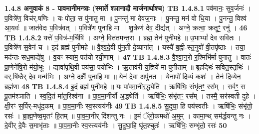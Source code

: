 \documentclass[17pt]{extarticle}
\begin{document}
                \textbf{ 1.4.8     अनुवाकं   8 - पावमानीमन्त्राः (स्मार्ते श्ञानादौ मार्जनार्थाश्च)} \newline
                                \textbf{ TB 1.4.8.1} \newline
                  पव॑मानः॒ सुव॒र्जनः॑ । प॒वित्रे॑ण॒ विच॑र्.षणिः । यः पोता॒ स पु॑नातु मा ॥ पु॒नन्तु॑ मा देवज॒नाः । पु॒नन्तु॒ मन॑ वो धि॒या । पु॒नन्तु॒ विश्व॑ आ॒यवः॑ ॥ जात॑वेदः प॒वित्र॑वत् । प॒वित्रे॑ण पुनाहि मा । शु॒क्रेण॑ देव॒ दीद्य॑त् । अग्ने॒ क्रत्वा॒ क्रतूꣳ॒॒ रनु॑ । \textbf{ 46} \newline
                  \newline
                                \textbf{ TB 1.4.8.2} \newline
                  यत्ते॑ प॒वित्र॑-म॒र्चिषि॑ । अग्ने॒ वित॑तमन्त॒रा । ब्रह्म॒ तेन॑ पुनीमहे ॥ उ॒भाभ्यां᳚ देव सवितः ।प॒वित्रे॑ण स॒वेन॑ च । इ॒दं ब्रह्म॑ पुनीमहे ॥ वै॒श्व॒दे॒वी पु॑न॒ती दे॒व्यागा᳚त् । यस्यै॑ ब॒ह्वी-स्त॒नुवो॑ वी॒तपृ॑ष्ठाः । तया॒ मद॑न्तः सध॒माद्ये॑षु । व॒यꣳ स्या॑म॒ पत॑यो रयी॒णाम् । \textbf{ 47} \newline
                  \newline
                                \textbf{ TB 1.4.8.3} \newline
                  वै॒श्वा॒न॒रो र॒श्मिभि॑र्मा पुनातु । वातः॑ प्रा॒णेने॑षि॒रो म॑यो॒भूः । द्यावा॑पृथि॒वी पय॑सा॒ पयो॑भिः । ऋ॒ताव॑री य॒ज्ञिये॑ मा पुनीताम् ॥ बृ॒हद्भिः॑ सवित॒स्तृभिः॑ । वर्.षि॑ष्ठैर् देव॒ मन्म॑भिः । अग्ने॒ दक्षैः᳚ पुनाहि मा ॥ येन॑ दे॒वा अपु॑नत । येनापो॑ दि॒व्यं कशः॑ । तेन॑ दि॒व्येन॒ ब्रह्म॑णा \textbf{ 48} \newline
                  \newline
                                \textbf{ TB 1.4.8.4} \newline
                  इ॒दं ब्रह्म॑ पुनीमहे ॥ यः पा॑वमा॒नीर॒द्ध्येति॑ । ऋषि॑भिः॒ संभृ॑तꣳ॒॒ रस᳚म् । सर्वꣳ॒॒ स पू॒तम॑श्ञाति । स्व॒दि॒तं मा॑त॒रिश्व॑ना ॥ पा॒व॒मा॒नीर्यो अ॒द्ध्येति॑ । ऋषि॑भिः॒ संभृ॑तꣳ॒॒ रस᳚म् । तस्मै॒ सर॑स्वती दुहे । क्षी॒रꣳ स॒र्पिर्-मधू॑द॒कम् ॥ पा॒व॒मा॒नीः स्व॒स्त्यय॑नीः \textbf{ 49} \newline
                  \newline
                                \textbf{ TB 1.4.8.5} \newline
                  सु॒दुघा॒ हि पय॑स्वतीः । ऋषि॑भिः॒ संभृ॑तो॒ रसः॑ । ब्रा॒ह्म॒णेष्व॒मृतꣳ॑ हि॒तम् ॥ पा॒व॒मा॒नीर् दि॑शन्तु नः । इ॒मं ॅलो॒कमथो॑ अ॒मुम् । कामा॒न्थ् सम॑र्द्धयन्तु नः । दे॒वीर् दे॒वैः स॒माभृ॑ताः ॥ पा॒व॒मा॒नीः स्व॒स्त्यय॑नीः । सु॒दुघा॒हि घृ॑त॒श्चुतः॑ । ऋषि॑भिः॒ सम्भृ॑तो॒ रसः॑ \textbf{ 50} \newline
\end{document}
